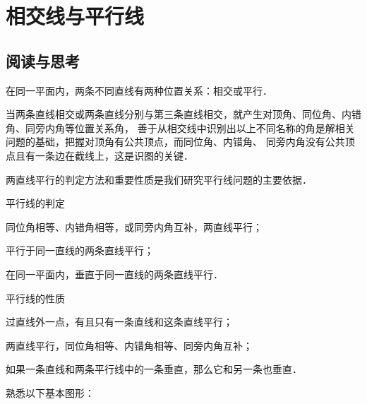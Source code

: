 \documentclass[a4paper]{ctexart}
\begin{document}
    \section*{相交线与平行线}
    \subsection*{阅读与思考}
    在同一平面内，两条不同直线有两种位置关系：相交或平行．

    当两条直线相交或两条直线分别与第三条直线相交，就产生对顶角、同位角、内错角、同旁内角等位置关系角，
    善于从相交线中识别出以上不同名称的角是解相关问题的基础，把握对顶角有公共顶点，而同位角、内错角、
    同旁内角没有公共顶点且有一条边在截线上，这是识图的关键．
    
    两直线平行的判定方法和重要性质是我们研究平行线问题的主要依据．
    \begin{asparaenum}
        \item 平行线的判定
        \begin{compactenum}
            \item 同位角相等、内错角相等，或同旁内角互补，两直线平行；
            \item 平行于同一直线的两条直线平行；
            \item 在同一平面内，垂直于同一直线的两条直线平行．
        \end{compactenum}
        \item 平行线的性质
        \begin{compactenum}
            \item 过直线外一点，有且只有一条直线和这条直线平行；
            \item 两直线平行，同位角相等、内错角相等、同旁内角互补；
            \item 如果一条直线和两条平行线中的一条垂直，那么它和另一条也垂直．
        \end{compactenum}
    \end{asparaenum} 

    熟悉以下基本图形：
\end{document}
